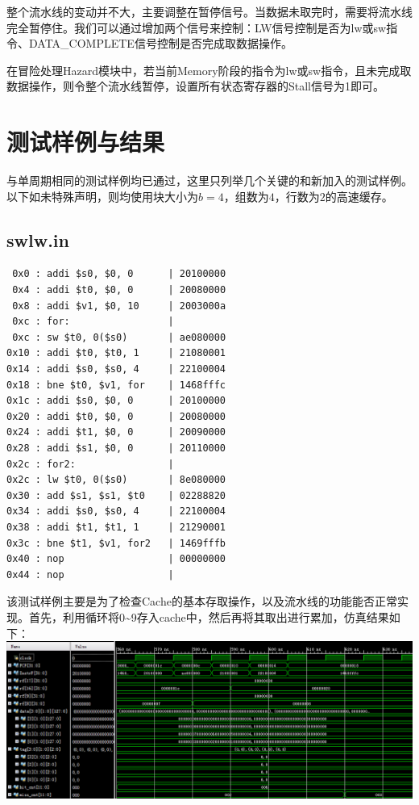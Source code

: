 \documentclass[12pt]{article} %
\begin{document}
\begin{sloppypar}
整个流水线的变动并不大，主要调整在暂停信号。当数据未取完时，需要将流水线完全暂停住。我们可以通过增加两个信号来控制：LW信号控制是否为lw或sw指令、DATA\_COMPLETE信号控制是否完成取数据操作。

在冒险处理Hazard模块中，若当前Memory阶段的指令为lw或sw指令，且未完成取数据操作，则令整个流水线暂停，设置所有状态寄存器的Stall信号为1即可。


\newpage
\section{测试样例与结果}

与单周期相同的测试样例均已通过，这里只列举几个关键的和新加入的测试样例。以下如未特殊声明，则均使用块大小为$b=4$，组数为$4$，行数为$2$的高速缓存。

\subsection{swlw.in}

\begin{lstlisting}
 0x0 : addi $s0, $0, 0      | 20100000
 0x4 : addi $t0, $0, 0      | 20080000
 0x8 : addi $v1, $0, 10     | 2003000a
 0xc : for:                 | 
 0xc : sw $t0, 0($s0)       | ae080000
0x10 : addi $t0, $t0, 1     | 21080001
0x14 : addi $s0, $s0, 4     | 22100004
0x18 : bne $t0, $v1, for    | 1468fffc
0x1c : addi $s0, $0, 0      | 20100000
0x20 : addi $t0, $0, 0      | 20080000
0x24 : addi $t1, $0, 0      | 20090000
0x28 : addi $s1, $0, 0      | 20110000
0x2c : for2:                | 
0x2c : lw $t0, 0($s0)       | 8e080000
0x30 : add $s1, $s1, $t0    | 02288820
0x34 : addi $s0, $s0, 4     | 22100004
0x38 : addi $t1, $t1, 1     | 21290001
0x3c : bne $t1, $v1, for2   | 1469fffb
0x40 : nop                  | 00000000
0x44 : nop                  | 
\end{lstlisting} 

该测试样例主要是为了检查Cache的基本存取操作，以及流水线的功能能否正常实现。首先，利用循环将0\~{}9存入cache中，然后再将其取出进行累加，仿真结果如下：
\includegraphics[width=\linewidth]{figure/swlw1.png}


\end{sloppypar}
\end{document}
